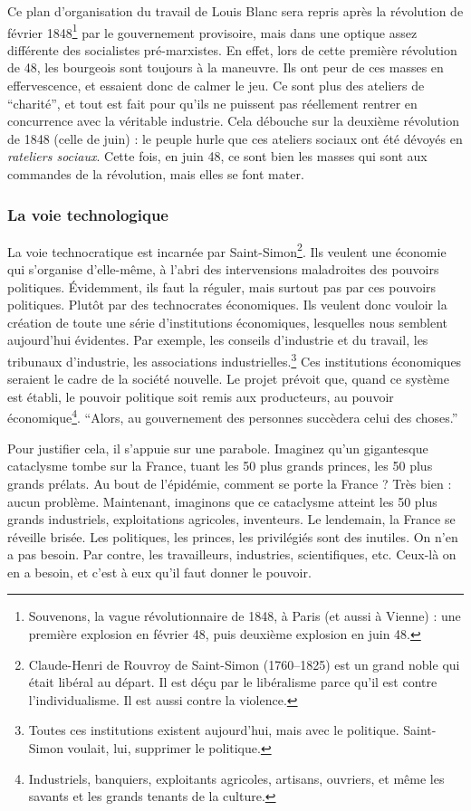 \documentclass[12pt]{report}
\begin{document}
Ce plan d'organisation du travail de Louis Blanc sera repris après la révolution de février 1848\footnote{Souvenons, la vague révolutionnaire de 1848, à Paris (et aussi à Vienne) : une première explosion en février 48, puis deuxième explosion en juin 48.} par le gouvernement provisoire, mais dans une optique assez différente des socialistes pré-marxistes.
En effet, lors de cette première révolution de 48, les bourgeois sont toujours à la maneuvre. Ils ont peur de ces masses en effervescence, et essaient donc de calmer le jeu. 
Ce sont plus des ateliers de \enquote{charité}, et tout est fait pour qu'ils ne puissent pas réellement rentrer en concurrence avec la véritable industrie.
Cela débouche sur la deuxième révolution de 1848 (celle de juin) : le peuple hurle que ces ateliers sociaux ont été dévoyés en \emph{rateliers sociaux}.
Cette fois, en juin 48, ce sont bien les masses qui sont aux commandes de la révolution, mais elles se font mater.

\subsubsection{La voie technologique}

La voie technocratique est incarnée par Saint-Simon\footnote{Claude-Henri de Rouvroy de Saint-Simon (1760--1825) est un grand noble qui était libéral au départ. Il est déçu par le libéralisme parce qu'il est contre l'individualisme. Il est aussi contre la violence.}. Ils veulent une économie qui s'organise d'elle-même, à l'abri des intervensions maladroites des pouvoirs politiques.
Évidemment, ils faut la réguler, mais surtout pas par ces pouvoirs politiques. Plutôt par des technocrates économiques.
Ils veulent donc vouloir la création de toute une série d'institutions économiques, lesquelles nous semblent aujourd'hui évidentes. Par exemple, les conseils d'industrie et du travail, les tribunaux d'industrie, les associations industrielles.\footnote{Toutes ces institutions existent aujourd'hui, mais avec le politique. Saint-Simon voulait, lui, supprimer le politique.}
Ces institutions économiques seraient le cadre de la société nouvelle.
Le projet prévoit que, quand ce système est établi, le pouvoir politique soit remis aux producteurs, au pouvoir économique\footnote{Industriels, banquiers, exploitants agricoles, artisans, ouvriers, et même les savants et les grands tenants de la culture.}.
\enquote{Alors, au gouvernement des personnes succèdera celui des choses.}

Pour justifier cela, il s'appuie sur une parabole. Imaginez qu'un gigantesque cataclysme tombe sur la France, tuant les 50 plus grands princes, les 50 plus grands prélats.
Au bout de l'épidémie, comment se porte la France ? Très bien : aucun problème.
Maintenant, imaginons que ce cataclysme atteint les 50 plus grands industriels, exploitations agricoles, inventeurs. Le lendemain, la France se réveille brisée.
Les politiques, les princes, les privilégiés sont des inutiles. On n'en a pas besoin.
Par contre, les travailleurs, industries, scientifiques, etc. Ceux-là on en a besoin, et c'est à eux qu'il faut donner le pouvoir.
\end{document}
